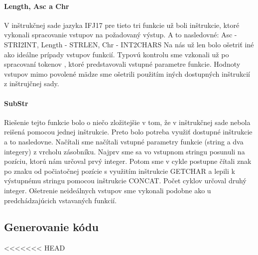 \documentclass{article}
\begin{document}
            \paragraph{Length, Asc a Chr}
            V inštrukčnej sade jazyka IFJ17 pre tieto tri funkcie už boli inštrukcie, ktoré vykonali spracovanie vstupov
            na požadovaný výstup. A to nasledovné: Asc - STRI2INT, Length - STRLEN, Chr - INT2CHARS
            Na nás už len bolo ošetriť iné ako ideálne prípady vstupov funkcií. Typovú kontrolu sme vzkonali už po spracovaní tokenov
            , ktoré predstavovali vstupné parametre funkcie. Hodnoty vstupov mimo povolené mädze sme ošetrili použitím iných dostupných
            inštrukcií z inštrujčnej sady.

            \paragraph{SubStr}
            Riešenie tejto funkcie bolo o niečo zložitejšie v tom, že v inštrukčnej sade nebola reišená pomocou jednej
            inštrukcie. Preto bolo potreba využiť dostupné inštrukcie a to nasledovne. Načítali sme načítali vstupné parametry
            funkcie (string a dva integery) z vrcholu zásobníku. Najprv sme sa vo vstupnom stringu posunuli na pozíciu, ktorú nám určoval
            prvý integer. Potom sme v cykle postupne čítali znak po znaku od počiatočnej pozície s využitím inštrukcie GETCHAR a lepili
            k výstupnému stringu pomocou inštrukcie CONCAT. Počet cyklov určoval druhý integer. Ošetrenie neideálnych vstupov sme
            vykonali podobne ako u predchádzajúcich vstavaných funkcií.
            
        \subsection{Generovanie kódu}
<<<<<<< HEAD
\end{document}

